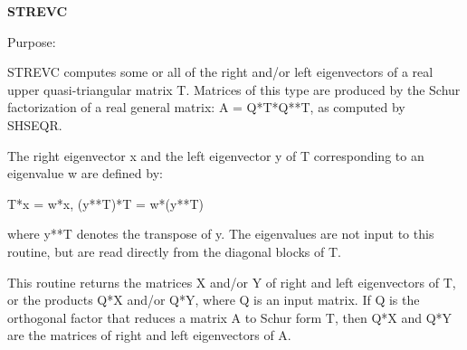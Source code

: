 {\bfseries S\+T\+R\+E\+V\+C} 

 \begin{DoxyParagraph}{Purpose\+: }
\begin{DoxyVerb} STREVC computes some or all of the right and/or left eigenvectors of
 a real upper quasi-triangular matrix T.
 Matrices of this type are produced by the Schur factorization of
 a real general matrix:  A = Q*T*Q**T, as computed by SHSEQR.
 
 The right eigenvector x and the left eigenvector y of T corresponding
 to an eigenvalue w are defined by:
 
    T*x = w*x,     (y**T)*T = w*(y**T)
 
 where y**T denotes the transpose of y.
 The eigenvalues are not input to this routine, but are read directly
 from the diagonal blocks of T.
 
 This routine returns the matrices X and/or Y of right and left
 eigenvectors of T, or the products Q*X and/or Q*Y, where Q is an
 input matrix.  If Q is the orthogonal factor that reduces a matrix
 A to Schur form T, then Q*X and Q*Y are the matrices of right and
 left eigenvectors of A.\end{DoxyVerb}
 
\end{DoxyParagraph}

